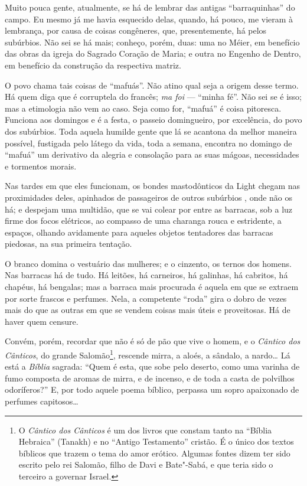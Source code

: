 Muito pouca gente, atualmente, se há de lembrar das antigas
``barraquinhas'' do campo. Eu mesmo já me havia esquecido delas, quando,
há pouco, me vieram à lembrança, por causa de coisas congêneres, que,
presentemente, há pelos subúrbios. Não sei se há mais; conheço, porém,
duas: uma no Méier, em benefício das obras da igreja do Sagrado Coração
de Maria; e outra no Engenho de Dentro, em benefício da construção da
respectiva matriz.

O povo chama tais coisas de ``mafuás''. Não atino qual seja a origem
desse termo. Há quem diga que é corruptela do francês; \emph{ma foi} ---
``minha fé''. Não sei se é isso; mas a etimologia não vem ao caso. Seja
como for, ``mafuá'' é coisa pitoresca. Funciona aos domingos e é a
festa, o passeio domingueiro, por excelência, do povo dos subúrbios.
Toda aquela humilde gente que lá se acantona da melhor maneira possível,
fustigada pelo látego da vida, toda a semana, encontra no domingo de
``mafuá'' um derivativo da alegria e consolação para as suas mágoas,
necessidades e tormentos morais.

Nas tardes em que eles funcionam, os bondes mastodônticos da Light
chegam nas proximidades deles, apinhados de passageiros de outros
subúrbios , onde não os há; e despejam uma multidão, que se vai colear
por entre as barracas, sob a luz firme dos focos elétricos, ao compasso
de uma charanga rouca e estridente, a espaços, olhando avidamente para
aqueles objetos tentadores das barracas piedosas, na sua primeira
tentação.

O branco domina o vestuário das mulheres; e o cinzento, os ternos dos
homens. Nas barracas há de tudo. Há leitões, há carneiros, há galinhas,
há cabritos, há chapéus, há bengalas; mas a barraca mais procurada é
aquela em que se extraem por sorte frascos e perfumes. Nela, a
competente ``roda'' gira o dobro de vezes mais do que as outras em que
se vendem coisas mais úteis e proveitosas. Há de haver quem censure.

Convém, porém, recordar que não é só de pão que vive o homem, e o
\emph{Cântico dos Cânticos}, do
grande Salomão\footnote{O \emph{Cântico dos Cânticos} é um dos livros
  que constam tanto na ``Bíblia Hebraica'' (Tanakh) e no ``Antigo
  Testamento'' cristão. É o único dos textos bíblicos que trazem o tema
  do amor erótico. Algumas fontes dizem ter sido escrito pelo rei
  Salomão, filho de Davi e Bate"-Sabá, e que teria sido o terceiro a
  governar Israel.}, rescende mirra, a aloés, a sândalo, a nardo\ldots{} Lá
está a \emph{Bíblia} sagrada: ``Quem é esta, que sobe pelo deserto, como
uma varinha de fumo composta de aromas de mirra, e de incenso, e de toda
a casta de polvilhos odoríferos?'' E, por todo aquele poema bíblico,
perpassa um sopro apaixonado de perfumes capitosos\ldots{}

